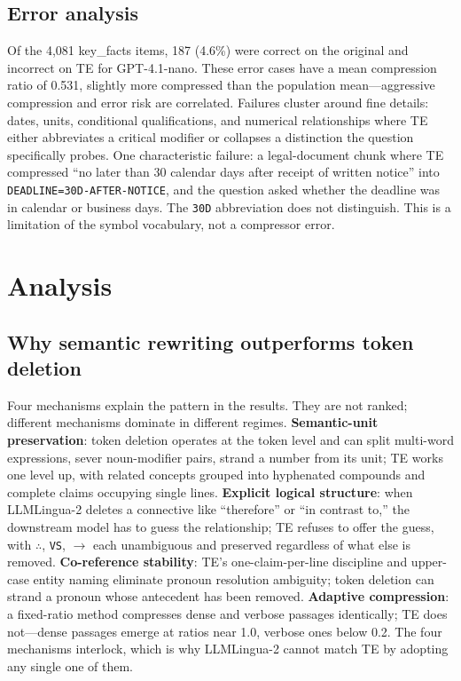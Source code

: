 \documentclass{article}
\newcommand{\teArrow}{\ensuremath{\rightarrow}}
\newcommand{\teTherefore}{\ensuremath{\therefore}}
\begin{document}
\subsection{Error analysis}

Of the 4{,}081 key\_facts items, 187 (4.6\%) were correct on the original and incorrect on TE for GPT-4.1-nano. These error cases have a mean compression ratio of 0.531, slightly more compressed than the population mean---aggressive compression and error risk are correlated. Failures cluster around fine details: dates, units, conditional qualifications, and numerical relationships where TE either abbreviates a critical modifier or collapses a distinction the question specifically probes. One characteristic failure: a legal-document chunk where TE compressed ``no later than 30 calendar days after receipt of written notice'' into \texttt{DEADLINE=30D-AFTER-NOTICE}, and the question asked whether the deadline was in calendar or business days. The \texttt{30D} abbreviation does not distinguish. This is a limitation of the symbol vocabulary, not a compressor error.

\section{Analysis}
\label{sec:analysis}

\subsection{Why semantic rewriting outperforms token deletion}

Four mechanisms explain the pattern in the results. They are not ranked; different mechanisms dominate in different regimes. \textbf{Semantic-unit preservation}: token deletion operates at the token level and can split multi-word expressions, sever noun-modifier pairs, strand a number from its unit; TE works one level up, with related concepts grouped into hyphenated compounds and complete claims occupying single lines. \textbf{Explicit logical structure}: when LLMLingua-2 deletes a connective like ``therefore'' or ``in contrast to,'' the downstream model has to guess the relationship; TE refuses to offer the guess, with \teTherefore{}, \texttt{VS}, \teArrow{} each unambiguous and preserved regardless of what else is removed. \textbf{Co-reference stability}: TE's one-claim-per-line discipline and upper-case entity naming eliminate pronoun resolution ambiguity; token deletion can strand a pronoun whose antecedent has been removed. \textbf{Adaptive compression}: a fixed-ratio method compresses dense and verbose passages identically; TE does not---dense passages emerge at ratios near 1.0, verbose ones below 0.2. The four mechanisms interlock, which is why LLMLingua-2 cannot match TE by adopting any single one of them.
\end{document}
